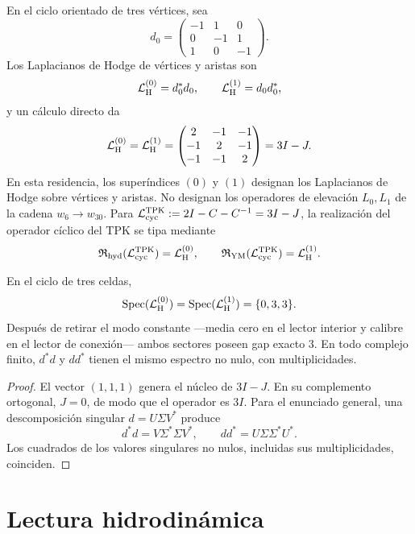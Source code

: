 En el ciclo orientado de tres vértices, sea
\[
 d_0=
 \begin{pmatrix}
 -1&1&0\\
 0&-1&1\\
 1&0&-1
 \end{pmatrix}.
\]
Los Laplacianos de Hodge de vértices y aristas son
\[
 \mathcal L_{\rm H}^{(0)}=d_0^\ast d_0,
 \qquad
 \mathcal L_{\rm H}^{(1)}=d_0d_0^\ast,
\]
y un cálculo directo da
\[
 \mathcal L_{\rm H}^{(0)}=\mathcal L_{\rm H}^{(1)}=
 \begin{pmatrix}
 2&-1&-1\\
 -1&2&-1\\
 -1&-1&2
 \end{pmatrix}
 =3I-J.
\]
En esta residencia, los superíndices \((0)\) y \((1)\) designan los
Laplacianos de Hodge sobre vértices y aristas. No designan los operadores de
elevación \(L_0,L_1\) de la cadena \(w_6\to w_{30}\). Para
\(\mathcal L_{\rm cyc}^{\rm TPK}:=2I-C-C^{-1}=3I-J\), la realización del
operador cíclico del TPK se tipa mediante
\[
 \mathfrak R_{\rm hyd}(\mathcal L_{\rm cyc}^{\rm TPK})
 =\mathcal L_{\rm H}^{(0)},\qquad
 \mathfrak R_{\rm YM}(\mathcal L_{\rm cyc}^{\rm TPK})
 =\mathcal L_{\rm H}^{(1)}.
\]

\begin{theorem}
\label{thm:operador-comun-frontera-ns-ym}
En el ciclo de tres celdas,
\[
 \operatorname{Spec}(\mathcal L_{\rm H}^{(0)})
 =\operatorname{Spec}(\mathcal L_{\rm H}^{(1)})
 =\{0,3,3\}.
\]
Después de retirar el modo constante ---media cero en el lector interior y
calibre en el lector de conexión--- ambos sectores poseen gap exacto \(3\).
En todo complejo finito, \(d^\ast d\) y \(dd^\ast\) tienen el mismo espectro
no nulo, con multiplicidades.
\end{theorem}

\begin{proof}
El vector \((1,1,1)\) genera el núcleo de \(3I-J\). En su complemento
ortogonal, \(J=0\), de modo que el operador es \(3I\). Para el enunciado
general, una descomposición singular \(d=U\Sigma V^\ast\) produce
\[
 d^\ast d=V\Sigma^\ast\Sigma V^\ast,
 \qquad
 dd^\ast=U\Sigma\Sigma^\ast U^\ast.
\]
Los cuadrados de los valores singulares no nulos, incluidas sus
multiplicidades, coinciden.
\end{proof}

\section{Lectura hidrodinámica}

